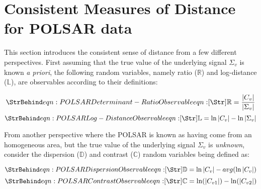 \section{Consistent Measures of Distance for POLSAR data}

This section introduces the consistent sense of distance from a few different perspectives.
First assuming that the true value of the underlying signal $\Sigma_v$ is known \textit{a priori},
the following random variables,
  namely ratio ($\mathbb{R}$) and log-distance ($\mathbb{L}$),
  are observables according to their definitions:

\begin{equation}
 \label{eqn:determinant_ratio_observables}
 \caption{eqn:POLSAR Determinant-Ratio Observable}
 \mathbb{R} = \frac{|C_v|}{|\Sigma_v|}
\end{equation}
\begin{equation}
 \label{eqn:log_distance_observables}
 \caption{eqn:POLSAR Log-Distance Observable}
 \mathbb{L} = \ln|C_v| - \ln|\Sigma_v|  
\end{equation}

From another perspective where the POLSAR is known as having come from an homogeneous area, but the true value of the underlying signal $\Sigma_v$ is \textit{unknown}, consider the dispersion ($\mathbb{D}$) and contrast ($\mathbb{C}$) random variables being defined as:
\begin{eqnarray}
\end{eqnarray}
\begin{equation}
 \label{eqn:dispersion_observable}
 \caption{eqn:POLSAR Dispersion Observable}
 \mathbb{D} = \ln{|C_v|} - avg(\ln{|C_v|})  
\end{equation}
\begin{equation}
  \label{eqn:contrast_observable}
  \caption{eqn:POLSAR Contrast Observable}
  \mathbb{C} = \ln(|C_{v1}|) - \ln(|C_{v2}|)
\end{equation}

